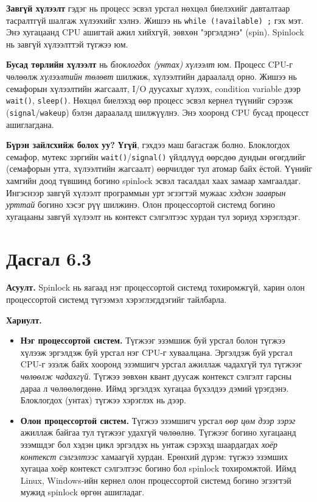 \documentclass[12pt,a4paper]{article}
\newcommand{\question}[2]{\section{Дасгал #1}\textbf{Асуулт.} #2\par\medskip\textbf{Хариулт.}\par}
\begin{document}
\textbf{Завгүй хүлээлт} гэдэг нь процесс эсвэл урсгал нөхцөл биелэхийг давталтаар тасралтгүй шалгаж хүлээхийг хэлнэ. Жишээ нь \texttt{while (!available) ;} гэх мэт. Энэ хугацаанд CPU ашигтай ажил хийхгүй, зөвхөн "эргэлдэнэ" (spin). Spinlock нь завгүй хүлээлттэй түгжээ юм.

\textbf{Бусад төрлийн хүлээлт} нь \emph{блоклогдох (унтах) хүлээлт} юм. Процесс CPU-г чөлөөлж \emph{хүлээлтийн төлөвт} шилжиж, хүлээлтийн дараалалд орно. Жишээ нь семафорын хүлээлтийн жагсаалт, I/O дуусахыг хүлээх, condition variable дээр \texttt{wait()}, \texttt{sleep()}. Нөхцөл биелэхэд өөр процесс эсвэл кернел түүнийг сэрээж (\texttt{signal}/\texttt{wakeup}) бэлэн дараалалд шилжүүлнэ. Энэ хооронд CPU бусад процесст ашиглагдана.

\textbf{Бүрэн зайлсхийж болох уу?} \textbf{Үгүй}, гэхдээ маш багасгаж болно. Блоклогдох семафор, мутекс зэргийн \texttt{wait()}/\texttt{signal()} үйлдлүүд өөрсдөө дундын өгөгдлийг (семафорын утга, хүлээлтийн жагсаалт) өөрчилдөг тул атомар байх ёстой. Үүнийг хамгийн доод түвшинд богино spinlock эсвэл тасалдал хаах замаар хамгаалдаг. Ингэснээр завгүй хүлээлт программын урт эгзэгтэй мужаас \emph{хэдхэн зааврын урттай} богино хэсэг рүү шилжинэ. Олон процессортой системд богино хугацааны завгүй хүлээлт нь контекст сэлгэлтээс хурдан тул зориуд хэрэглэдэг.

\question{6.3}{Spinlock нь яагаад нэг процессортой системд тохиромжгүй, харин олон процессортой системд түгээмэл хэрэглэгддэгийг тайлбарла.}

\begin{itemize}[leftmargin=1.5em]
  \item \textbf{Нэг процессортой систем.} Түгжээг эзэмшиж буй урсгал болон түгжээ хүлээж эргэлдэж буй урсгал нэг CPU-г хуваалцана. Эргэлдэж буй урсгал CPU-г эзэлж байх хооронд эзэмшигч урсгал ажиллаж чадахгүй тул түгжээг \emph{чөлөөлж чадахгүй}. Түгжээ зөвхөн квант дуусаж контекст сэлгэлт гарсны дараа л чөлөөлөгдөнө. Иймд эргэлдэх хугацаа бүхэлдээ дэмий үрэгдэнэ. Блоклогдох (унтах) түгжээ хэрэглэх нь дээр.
  \item \textbf{Олон процессортой систем.} Түгжээ эзэмшигч урсгал \emph{өөр цөм дээр зэрэг} ажиллаж байгаа тул түгжээг удахгүй чөлөөлнө. Түгжээг богино хугацаанд эзэмшдэг бол хэдэн цикл эргэлдэх нь унтаж сэрэхэд шаардагдах \emph{хоёр контекст сэлгэлтээс} хамаагүй хурдан. Ерөнхий дүрэм: түгжээ эзэмших хугацаа хоёр контекст сэлгэлтээс богино бол spinlock тохиромжтой. Иймд Linux, Windows-ийн кернел олон процессортой системд богино эгзэгтэй мужид spinlock өргөн ашигладаг.
\end{itemize}
\end{document}
